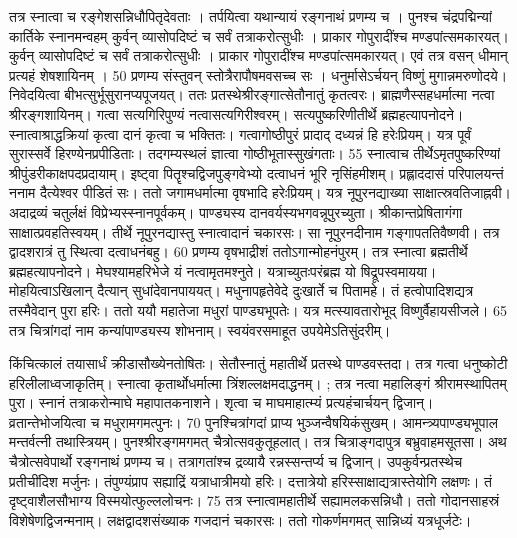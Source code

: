 तत्र स्नात्वा च रङ्गेशसन्निधौपितृदेवताः ।
 तर्पयित्वा यथान्यायं रङ्गनाथं प्रणम्य च ।
 पुनश्च चंद्रपद्मिन्यां कार्तिके स्नानमन्वहम् कुर्वन् व्यासोपदिष्टं च सर्वं तत्राकरोत्सुधीः ।
 प्राकार गोपुरादींश्च मण्डपांत्समकारयत्।
 कुर्वन् व्यासोपदिष्टं च सर्वं तत्राकरोत्सुधीः ।
 प्राकार गोपुरादींश्च मण्डपांत्समकारयत्।
 एवं तत्र वसन् धीमान् प्रत्यहं शेषशायिनम् ।
 50 प्रणम्य संस्तुवन् स्तोत्रैरापौषमवसच्च सः ।
 धनुर्मासेऽर्चयन् विष्णुं मुगान्नमरुणोदये।
 निवेदयित्वा बीभत्सुर्भूसुरानप्यपूजयत्।
 ततः प्रतस्थेश्रीरङ्गात्सेतौनातुं कृतत्वरः।
 ब्राह्मणैस्सहधर्मात्मा नत्वा श्रीरङ्गशायिनम्।
 गत्वा सत्यगिरिपुण्यं नत्वासत्यगिरीश्वरम्।
 सत्यपुष्करिणीतीर्थे ब्रह्महत्यापनोदने।
 स्नात्वाश्राद्धक्रियां कृत्वा दानं कृत्वा च भक्तितः।
 गत्वागोष्ठीपुरं प्रादाद् दध्यन्नं हि हरेःप्रियम्।
 यत्र पूर्वं सुरास्सर्वे हिरण्येनप्रपीडिताः।
 तदगम्यस्थलं ज्ञात्वा गोष्ठीभूतास्सुखंगताः।
 55 स्नात्वाच तीर्थेऽमृतपुष्करिण्यां
श्रीपुंडरीकाक्षपदप्रदायाम्।
 इष्ट्वा पितॄश्चद्विजपुङ्गवेभ्यो
दत्वाधनं भूरि नृसिंहमीशम्।
 प्रह्लाददासं परिपालयन्तं ननाम
दैत्येश्वर पीडितं सः।
 ततो जगामधर्मात्मा वृषभादि हरेःप्रियम्।
 यत्र नूपुरनद्याख्या साक्षात्स्रवतिजाह्नवी।
 अदाद्रव्यं चतुर्लक्षं विप्रेभ्यस्स्नानपूर्वकम्।
 पाण्ड्यस्य दानवर्यस्यभगवन्नूपुरच्युता।
 श्रीकान्तप्रेषितागंगा साक्षात्प्रवहतिस्वयम्।
 तीर्थे नूपुरनद्यास्तु स्नात्वादानं चकारसः।
 सा नूपुरनदीनाम गङ्गापततिवैष्णवी।
 तत्र द्वादशरात्रं तु स्थित्वा दत्वाधनंबहु।
 60 प्रणम्य वृषभाद्रीशं ततोऽगान्मोहनंपुरम्।
 तत्र स्नात्वा ब्रह्मतीर्थे ब्रह्महत्यापनोदने।
 मेघश्यामहरिभेजे यं नत्वामृतमश्नुते।
 यत्राच्युतःपरंब्रह्म यो षिद्रूपस्वमायया।
 मोहयित्वाऽखिलान् दैत्यान् सुधांदेवानपाययत्।
 मधुनापहृतेवेदे दुःखार्ते च पितामहे।
 तं हत्वोपादिशद्यत्र तस्मैवेदान् पुरा हरिः।
 ततो ययौ महातेजा मधुरां पाण्ड्यभूपतेः।
 यत्र मत्स्यावतारोभूद् विष्णुर्वैहायसीजले।
 65 तत्र चित्रांगदां नाम कन्यांपाण्ड्यस्य शोभनाम्।
 स्वयंवरसमाहूत उपयेमेऽतिसुंदरीम्।
 
किंचित्कालं तयासार्धं क्रीडासौख्येनतोषितः।
 सेतौस्नातुं महातीर्थे प्रतस्थे पाण्डवस्तदा।
 तत्र गत्वा धनुष्कोटी हरिलीलाध्वजाकृतिम्।
 स्नात्वा कृतार्थोधर्मात्मा त्रिंशल्लक्षमदाद्धनम्।
 ; तत्र नत्वा महालिङ्गं श्रीरामस्थापितम् पुरा।
 स्नानं तत्राकरोन्माघे महापातकनाशने।
 शृत्वा च माघमाहात्म्यं प्रत्यहंचार्चयन् द्विजान्।
 व्रतान्तेभोजयित्वा च मधुरामगमत्पुनः।
 70 पुनश्चित्रांगदां प्राप्य भुञ्जन्वैषयिकंसुखम्।
 आमन्त्र्यपाण्ड्यभूपाल मन्तर्वत्नी तथास्त्रियम्।
 पुनश्श्रीरङ्गमगमत् चैत्रोत्सवकुतूहलात्।
 तत्र चित्राङ्गदापुत्र बभ्रुवाहमसूतसा।
 अथ चैत्रोत्सवेपार्थो रङ्गनाथं प्रणम्य च।
 तत्रागतांश्च द्रव्यायै रन्नस्सन्तर्प्य च द्विजान्।
 उपकुर्वन्प्रतस्थेच प्रतीचींदिश मर्जुनः।
 तंपुण्यंप्राप सह्याद्रिं यत्राधात्रीमयो हरिः।
 दत्तात्रेयो हरिस्साक्षाद्यत्रास्तेयोगि लक्षणः।
 तं दृष्ट्वाशैलसौभाग्य विस्मयोत्फुल्ललोचनः।
 75 तत्र स्नात्वामहातीर्थे सह्यामलकसन्निधौ।
 ततो गोदानसाहस्रं विशेषेणद्विजन्मनाम्।
 लक्षद्वादशसंख्याक गजदानं चकारसः।
 ततो गोकर्णमगमत् सान्निध्यं यत्रधूर्जटेः।
 
